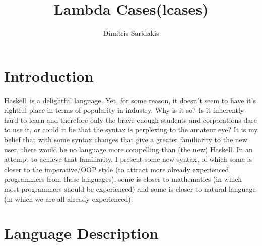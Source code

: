 \documentclass{article}
\date{}
\author{
  Dimitris Saridakis
}
\def\H{Haskell}
\begin{document}
\title{
\textbf{Lambda Cases(lcases)}
}
\maketitle

\tableofcontents

\section{Introduction}

\H\ is a delightful language. Yet, for some reason, it doesn't seem to have it's 
rightful place in terms of popularity in industry. Why is it so?
Is it inherently hard to learn
and therefore only the brave enough students and corporations dare to use it, or
could it be that the syntax is perplexing to the amateur eye? It is my belief that 
with some syntax changes that give a greater familiarity to the new user, there
would be no language more compelling than (the new) \H. In an attempt to achieve
that familiarity, I present some new syntax, of which
some is closer to the imperative/OOP style (to attract more already experienced
programmers from these languages), some is closer to mathematics (in which most 
programmers should be experienced) and some is closer to natural language
(in which we are all already experienced). 

\section{Language Description}
\end{document}
